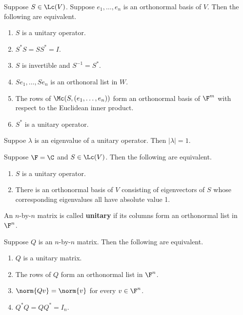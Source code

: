 \documentclass{extarticle}
\begin{document}
\begin{thm}
    Suppose \(S \in \Lc(V)\). Suppose \(e_1, \ldots, e_n\) is an orthonormal basis of \(V\).
    Then the following are equivalent.
    \begin{enumerate}[label=(\alph*)]
        \item \(S\) is a unitary operator.
        \item \(S^* S = SS^* =  I\).
        \item \(S\) is invertible and \(S^{-1} =S^*\).
        \item \(Se_1, \ldots, Se_n\) is an orthonoral list in \(W\).
        \item The rows of \(\Mc(S, (e_1, \ldots, e_n))\) form an orthonormal
        basis of \(\F^m\) with respect to the Euclidean inner product.
        \item \(S^*\) is a unitary operator.
    \end{enumerate}
\end{thm}

\begin{corollary}
    Suppoe \(\lambda\) is an eigenvalue of a unitary operator. Then
    \(|\lambda| = 1\).
\end{corollary}

\begin{corollary}
    Suppose \(\F = \C\) and \(S \in \Lc(V)\). Then the following are equivalent.
    \begin{enumerate}[label=(\alph*)]
        \item \(S\) is a unitary operator.
        \item There is an orthonormal basis of \(V\) consisting of eigenvectors of \(S\) whose
        corresponding eigenvalues all have absolute value 1.
    \end{enumerate}
\end{corollary}

\begin{definition}
    An \(n\)-by-\(n\) matrix is called \textbf{unitary} if its columns form an orthonormal list in \(\F^n\).
\end{definition}

\begin{thm}
    Suppose \(Q\) is an \(n\)-by-\(n\) matrix. Then the following are equivalent.
    \begin{enumerate}[label=(\alph*)]
        \item \(Q\) is a unitary matrix.
        \item The rows of \(Q\) form an orthonormal list in \(\F^n\).
        \item \(\norm{Qv} = \norm{v}\) for every \(v \in \F^n\).
        \item \(Q^* Q = Q Q^* = I_n\).
    \end{enumerate}
\end{thm}
\end{document}
